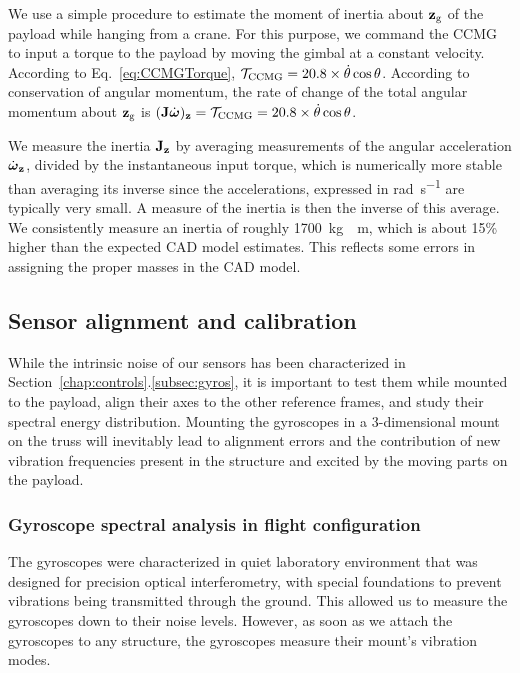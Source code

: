 We use a simple procedure to estimate the moment of inertia about $\textrm{\textbf{z}}_{\textrm{g}}$ of the payload while hanging from a crane. For this purpose, we command the CCMG to input a torque to the payload by moving the gimbal at a constant velocity. According to Eq.~\ref{eq:CCMGTorque}, $\mathcal{T}_{\textrm{CCMG}} =  20.8\times \dot{\theta}\cos\theta$. According to conservation of angular momentum, the rate of change of the total angular momentum about $\textrm{\textbf{z}}_{\textrm{g}}$ is $(\textrm{\textbf{J}}\dot{\boldsymbol\omega})_{\textrm{\textbf{z}}} = \mathcal{T}_{\textrm{CCMG}} = 20.8\times \dot{\theta}\cos\theta$.

We measure the inertia $\textrm{\textbf{J}}_{\textrm{\textbf{z}}}$ by averaging measurements of the angular acceleration $\dot{\boldsymbol\omega}_{\textrm{\textbf{z}}}$, divided by the instantaneous input torque, which is numerically more stable than averaging its inverse since the accelerations, expressed in \si{\radian\per\second} are typically very small. A measure of the inertia is then the inverse of this average. We consistently measure an inertia of roughly \SI{1700}{\kilo\gram{}\meter}, which is about 15\% higher than the expected CAD model estimates. This reflects some errors in assigning the proper masses in the CAD model.


\subsection{Sensor alignment and calibration}
While the intrinsic noise of our sensors has been characterized in Section~\ref{chap:controls}.\ref{subsec:gyros}, it is important to test them while mounted to the payload, align their axes to the other reference frames, and study their spectral energy distribution. Mounting the gyroscopes in a 3-dimensional mount on the truss will inevitably lead to alignment errors and the contribution of new vibration frequencies present in the structure and excited by the moving parts on the payload.


\subsubsection{Gyroscope spectral analysis in flight configuration}

The gyroscopes were characterized in quiet laboratory environment that was designed for precision optical interferometry, with special foundations to prevent vibrations being transmitted through the ground. This allowed us to measure the gyroscopes down to their noise levels. However, as soon as we attach the gyroscopes to any structure, the gyroscopes measure their mount's vibration modes. 

